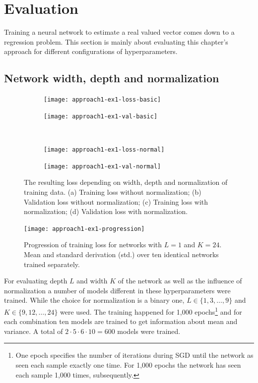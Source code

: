 \section{Evaluation}

Training a neural network to estimate a real valued vector comes down to a regression problem. This section is mainly about evaluating this chapter's approach for different configurations of hyperparameters.

\subsection{Network width, depth and normalization}

\begin{figure}
	\centering
	\begin{subfigure}{0.49\linewidth}
		\texttt{[image: approach1-ex1-loss-basic]}
		\caption{}
	\end{subfigure}
	\begin{subfigure}{0.49\linewidth}
		\texttt{[image: approach1-ex1-val-basic]}
		\caption{}
	\end{subfigure}
	\\
	\begin{subfigure}{0.49\linewidth}
		\texttt{[image: approach1-ex1-loss-normal]}
		\caption{}
	\end{subfigure}
	\begin{subfigure}{0.49\linewidth}
		\texttt{[image: approach1-ex1-val-normal]}
		\caption{}
	\end{subfigure}
	\caption[Resulting loss depending on width, depth and normalization]{The resulting loss depending on width, depth and normalization of training data. (a) Training loss without normalization; (b) Validation loss without normalization; (c) Training loss with normalization; (d) Validation loss with normalization.}
	\label{fig:approach1-ex1}
\end{figure}

\begin{figure}
	\centering
	\texttt{[image: approach1-ex1-progression]}
	\caption[Progression of training loss for networks with $L=1$ and $K=24$]{Progression of training loss for networks with $L=1$ and $K=24$. Mean and standard derivation (std.) over ten identical networks trained separately.}
	\label{fig:approach1-ex1-progression}
\end{figure}

For evaluating depth $L$ and width $K$ of the network as well as the influence of normalization a number of models different in these hyperparameters were trained. While the choice for normalization is a binary one, $L \in \{1,3,\dots,9\}$ and $K \in \{9,12,\dots,24\}$ were used. The training happened for 1,000 epochs\footnote{%
	One epoch specifies the number of iterations during SGD until the network as seen each sample exactly one time. For 1,000 epochs the network has seen each sample 1,000 times, subsequently.}
and for each combination ten models are trained to get information about mean and variance. A total of $2 \cdot 5 \cdot 6 \cdot 10 = 600$ models were trained.

